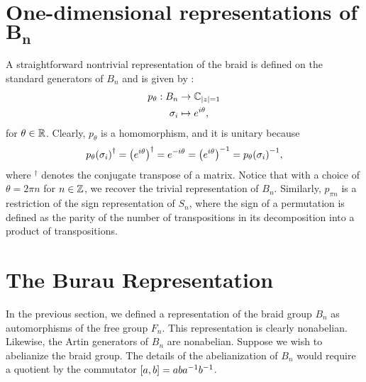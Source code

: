 \section[One-dimensional representations of $B_n$]{One-dimensional representations of $\mathbf{B_n}$}
A straightforward nontrivial representation of the braid is defined on the standard generators of $B_n$ and is given by \cite{Deshmukh}:
\begin{align}
    p_\theta: B_n&\to \mathbb{C}_{\left|z\right|=1} \\
    \sigma_i &\mapsto e^{i\theta},
\end{align}
for $\theta\in\mathbb{R}$. Clearly, $p_\theta$ is a homomorphism, and it is unitary because
\begin{equation}
    {p_\theta(\sigma_i)}^\dagger = {\left( e^{i\theta} \right)}^\dagger = e^{-i\theta} = { \left( e^{i\theta} \right) }^{-1} = { p_\theta(\sigma_i) }^{-1},
\end{equation}
where $^\dagger$ denotes the conjugate transpose of a matrix. Notice that with a choice of $\theta=2\pi n$ for $n\in\mathbb{Z}$, we recover the trivial representation of $B_n$. Similarly, $p_{\pi n}$ is a restriction of the sign representation of $S_n$, where the sign of a permutation is defined as the parity of the number of transpositions in its decomposition into a product of transpositions.


\section{The Burau Representation}
In the previous section, we defined a representation of the braid group $B_n$ as automorphisms of the free group $F_n$. This representation is clearly nonabelian. Likewise, the Artin generators of $B_n$ are nonabelian. Suppose we wish to abelianize the braid group. The details of the abelianization of $B_n$ would require a quotient by the commutator $\left[ a,b \right]=ab{ a }^{-1}{ b }^{-1}$.


